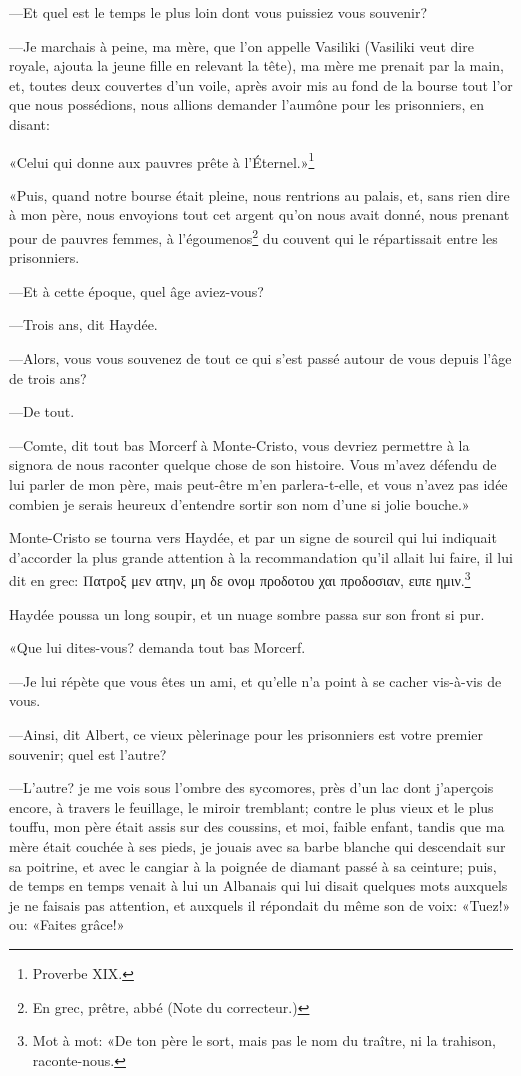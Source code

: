 —Et quel est le temps le plus loin dont vous puissiez vous souvenir? 

—Je marchais à peine, ma mère, que l'on appelle Vasiliki (Vasiliki veut dire royale, ajouta la jeune fille en relevant la tête), ma mère me prenait par la main, et, toutes deux couvertes d'un voile, après avoir mis au fond de la bourse tout l'or que nous possédions, nous allions demander l'aumône pour les prisonniers, en disant: 

«Celui qui donne aux pauvres prête à l'Éternel.»\footnote{Proverbe XIX.}  

«Puis, quand notre bourse était pleine, nous rentrions au palais, et, sans rien dire à mon père, nous envoyions tout cet argent qu'on nous avait donné, nous prenant pour de pauvres femmes, à l'égoumenos\footnote{En grec, prêtre, abbé (Note du correcteur.)} du couvent qui le répartissait entre les prisonniers.  

—Et à cette époque, quel âge aviez-vous? 

—Trois ans, dit Haydée. 

—Alors, vous vous souvenez de tout ce qui s'est passé autour de vous depuis l'âge de trois ans? 

—De tout. 

—Comte, dit tout bas Morcerf à Monte-Cristo, vous devriez permettre à la signora de nous raconter quelque chose de son histoire. Vous m'avez défendu de lui parler de mon père, mais peut-être m'en parlera-t-elle, et vous n'avez pas idée combien je serais heureux d'entendre sortir son nom d'une si jolie bouche.» 

Monte-Cristo se tourna vers Haydée, et par un signe de sourcil qui lui indiquait d'accorder la plus grande attention à la recommandation qu'il allait lui faire, il lui dit en grec: Πατροξ μεν ατην, μη δε ονομ προδοτου χαι προδοσιαν, ειπε ημιν.\footnote{Mot à mot: «De ton père le sort, mais pas le nom du traître, ni la trahison, raconte-nous.}

Haydée poussa un long soupir, et un nuage sombre passa sur son front si pur. 

«Que lui dites-vous? demanda tout bas Morcerf. 

—Je lui répète que vous êtes un ami, et qu'elle n'a point à se cacher vis-à-vis de vous. 

—Ainsi, dit Albert, ce vieux pèlerinage pour les prisonniers est votre premier souvenir; quel est l'autre? 

—L'autre? je me vois sous l'ombre des sycomores, près d'un lac dont j'aperçois encore, à travers le feuillage, le miroir tremblant; contre le plus vieux et le plus touffu, mon père était assis sur des coussins, et moi, faible enfant, tandis que ma mère était couchée à ses pieds, je jouais avec sa barbe blanche qui descendait sur sa poitrine, et avec le cangiar à la poignée de diamant passé à sa ceinture; puis, de temps en temps venait à lui un Albanais qui lui disait quelques mots auxquels je ne faisais pas attention, et auxquels il répondait du même son de voix: «Tuez!» ou: «Faites grâce!» 

